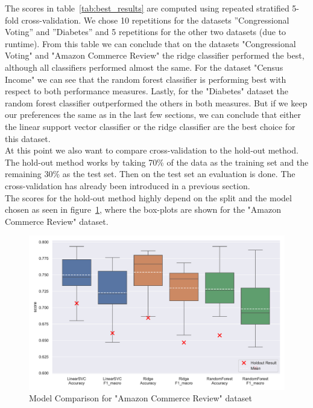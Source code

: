 \documentclass[a4paper,10pt]{article}
\begin{document}
The scores in table~\ref{tab:best_results} are computed using repeated stratified 5-fold
cross-validation. We chose 10 repetitions for the datasets ”Congressional Voting” and ”Diabetes” and 5
repetitions for the other two datasets (due to runtime).
From this table we can conclude that on the datasets "Congressional Voting" and 
"Amazon Commerce Review" the ridge classifier
performed the best, although all classifiers performed almost the same. For the dataset "Census Income" we can see that
the random forest classifier is performing best with respect to both performance measures. Lastly,
for the "Diabetes" dataset the random forest classifier outperformed the others in both measures. But if we keep our preferences the same as in the
last few sections, we can conclude that either the linear support vector classifier or the ridge classifier
are the best choice for this dataset. \\
At this point we also want to compare cross-validation to the hold-out method. 
The hold-out method works by taking 70\% of the data as the training set and the remaining 30\% as the test set.
Then on the test set an evaluation is done. The cross-validation has already been introduced in a previous section.\\
The scores for the hold-out method
highly depend on the split and the model chosen as seen in figure~\ref{fig:model_comparison amazon},
where the box-plots are shown for the
"Amazon Commerce Review" dataset.



\begin{figure}[h!]
\centering
\includegraphics[width=\textwidth]{amazon/plots/model_comparison.pdf}
\caption{Model Comparison for "Amazon Commerce Review" dataset}
\label{fig:model_comparison amazon}
\end{figure}
\end{document}
